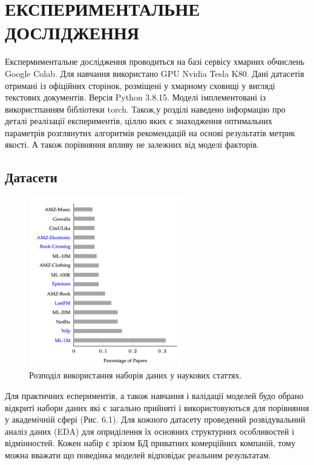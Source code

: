 \section{ЕКСПЕРИМЕНТАЛЬНЕ ДОСЛІДЖЕННЯ}
Експермиментальне дослідження проводиться на базі сервісу хмарних обчислень  Google Colab. Для навчання використано GPU Nvidia Tesla K80. Дані датасетів отримані із офіційних сторінок, розміщені у хмарному сховищі у вигляді текстових документів. Версія Python 3.8.15. Моделі імплементовані із використпанням бібліотеки torch.
Також,у розділі наведено інформацію про деталі реалізації експериментів, ціллю яких є знаходження оптимальних параметрів розглянутих алгоритмів рекомендацій на основі результатів метрик якості. А також порівняння впливу не залежних від моделі факторів.

\subsection{Датасети}
\begin{figure}[H]
    \centering
    \includegraphics[width=0.6\textwidth]{images/dataset_dist.png}
    \caption{Розподіл використання наборів даних у наукових статтях.}
\end{figure}
Для практичних еспериментів, а також навчання і валідації моделей будо обрано відкриті набори даних які є загально прийняті і використовуються для порівняння у академічній сфері (Рис. 6.1). Для кожного датасету проведений розвідувальний аналіз даних (EDA) для оприділення їх основних структурних особливостей і відмінностей. Кожен набір є зрізом БД приватних комерційних компаній, тому можна вважати що поведінка моделей відповідає реальним результатам.

